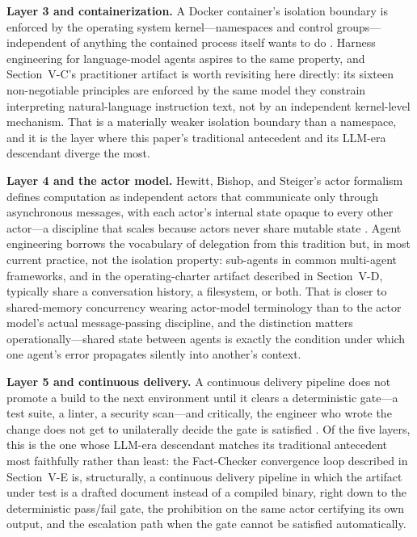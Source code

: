 \documentclass[journal]{IEEEtran}
\begin{document}
\textbf{Layer 3 and containerization.} A Docker container's isolation boundary is enforced by the operating system kernel---namespaces and control groups---independent of anything the contained process itself wants to do \cite{merkel2014docker}. Harness engineering for language-model agents aspires to the same property, and Section~V-C's practitioner artifact is worth revisiting here directly: its sixteen non-negotiable principles are enforced by the same model they constrain interpreting natural-language instruction text, not by an independent kernel-level mechanism. That is a materially weaker isolation boundary than a namespace, and it is the layer where this paper's traditional antecedent and its LLM-era descendant diverge the most.

\textbf{Layer 4 and the actor model.} Hewitt, Bishop, and Steiger's actor formalism defines computation as independent actors that communicate only through asynchronous messages, with each actor's internal state opaque to every other actor---a discipline that scales because actors never share mutable state \cite{hewitt1973universal}. Agent engineering borrows the vocabulary of delegation from this tradition but, in most current practice, not the isolation property: sub-agents in common multi-agent frameworks, and in the operating-charter artifact described in Section~V-D, typically share a conversation history, a filesystem, or both. That is closer to shared-memory concurrency wearing actor-model terminology than to the actor model's actual message-passing discipline, and the distinction matters operationally---shared state between agents is exactly the condition under which one agent's error propagates silently into another's context.

\textbf{Layer 5 and continuous delivery.} A continuous delivery pipeline does not promote a build to the next environment until it clears a deterministic gate---a test suite, a linter, a security scan---and critically, the engineer who wrote the change does not get to unilaterally decide the gate is satisfied \cite{humble2010continuous}. Of the five layers, this is the one whose LLM-era descendant matches its traditional antecedent most faithfully rather than least: the Fact-Checker convergence loop described in Section~V-E is, structurally, a continuous delivery pipeline in which the artifact under test is a drafted document instead of a compiled binary, right down to the deterministic pass/fail gate, the prohibition on the same actor certifying its own output, and the escalation path when the gate cannot be satisfied automatically.
\end{document}
